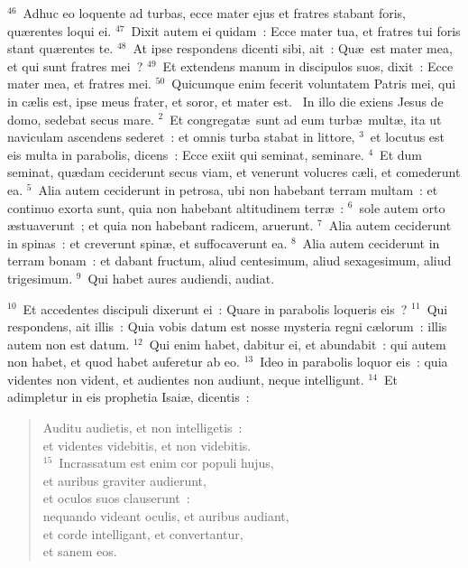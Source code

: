 ${}^{46}$~Adhuc eo loquente ad turbas, ecce mater ejus et fratres stabant foris, qu\ae rentes loqui ei.
${}^{47}$~Dixit autem ei quidam~: Ecce mater tua, et fratres tui foris stant qu\ae rentes te.
${}^{48}$~At ipse respondens dicenti sibi, ait~: Qu\ae\ est mater mea, et qui sunt fratres mei~?
${}^{49}$~Et extendens manum in discipulos suos, dixit~: Ecce mater mea, et fratres mei.
${}^{50}$~Quicumque enim fecerit voluntatem Patris mei, qui in c\ae lis est, ipse meus frater, et soror, et mater est.
~In illo die exiens Jesus de domo, sedebat secus mare.
${}^{2}$~Et congregat\ae\ sunt ad eum turb\ae\ mult\ae , ita ut naviculam ascendens sederet~: et omnis turba stabat in littore,
${}^{3}$~et locutus est eis multa in parabolis, dicens~: Ecce exiit qui seminat, seminare.
${}^{4}$~Et dum seminat, qu\ae dam ceciderunt secus viam, et venerunt volucres c\ae li, et comederunt ea.
${}^{5}$~Alia autem ceciderunt in petrosa, ubi non habebant terram multam~: et continuo exorta sunt, quia non habebant altitudinem terr\ae~:
${}^{6}$~sole autem orto \ae stuaverunt~; et quia non habebant radicem, aruerunt.
${}^{7}$~Alia autem ceciderunt in spinas~: et creverunt spin\ae , et suffocaverunt ea.
${}^{8}$~Alia autem ceciderunt in terram bonam~: et dabant fructum, aliud centesimum, aliud sexagesimum, aliud trigesimum.
${}^{9}$~Qui habet aures audiendi, audiat.


${}^{10}$~Et accedentes discipuli dixerunt ei~: Quare in parabolis loqueris eis~?
${}^{11}$~Qui respondens, ait illis~: Quia vobis datum est nosse mysteria regni c\ae lorum~: illis autem non est datum.
${}^{12}$~Qui enim habet, dabitur ei, et abundabit~: qui autem non habet, et quod habet auferetur ab eo.
${}^{13}$~Ideo in parabolis loquor eis~: quia videntes non vident, et audientes non audiunt, neque intelligunt.
${}^{14}$~Et adimpletur in eis prophetia Isai\ae , dicentis~: \begin{flushleft}\begin{verse}Auditu audietis, et non intelligetis~:\\ et videntes videbitis, et non videbitis.\\
${}^{15}$~Incrassatum est enim cor populi hujus,\\ et auribus graviter audierunt,\\ et oculos suos clauserunt~:\\ nequando videant oculis, et auribus audiant,\\ et corde intelligant, et convertantur,\\ et sanem eos.\end{verse}\end{flushleft}


